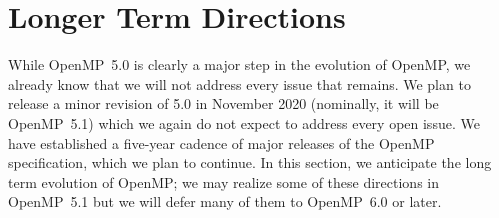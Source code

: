 \section{Longer Term Directions}
\label{sec:future_directions}

While OpenMP~5.0 is clearly a major step in the evolution of OpenMP,
we already know that we will not address every issue that remains.
We plan to release a minor revision of 5.0 in November 2020 (nominally,
it will be OpenMP~5.1) which we again do not expect to address every
open issue. We have established a five-year cadence of major releases 
of the OpenMP specification, which we plan to continue. In this section, 
we anticipate the long term evolution of OpenMP; we may realize some of 
these directions in OpenMP~5.1 but we will defer many of them to OpenMP~6.0 
or later. 










